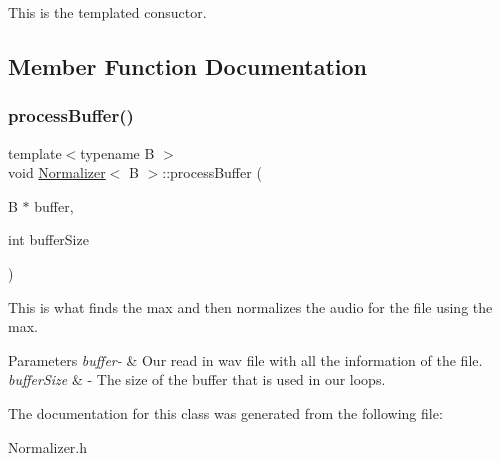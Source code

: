 This is the templated consuctor. 

\subsection{Member Function Documentation}
\mbox{\label{classNormalizer_a30a5a6459facb09f5dc2c7c0a0c335c8}} 
\subsubsection{\texorpdfstring{process\+Buffer()}{processBuffer()}}
{\footnotesize\ttfamily template$<$typename B $>$ \\
void \hyperlink{classNormalizer}{Normalizer}$<$ B $>$\+::process\+Buffer (\begin{DoxyParamCaption}\item[{B $\ast$}]{buffer,  }\item[{int}]{buffer\+Size }\end{DoxyParamCaption})}

This is what finds the max and then normalizes the audio for the file using the max. 
\begin{DoxyParams}{Parameters}
{\em buffer-\/} & Our read in wav file with all the information of the file. \\
\hline
{\em buffer\+Size} & -\/ The size of the buffer that is used in our loops. \\
\hline
\end{DoxyParams}


The documentation for this class was generated from the following file\+:\begin{DoxyCompactItemize}
\item 
Normalizer.\+h\end{DoxyCompactItemize}

